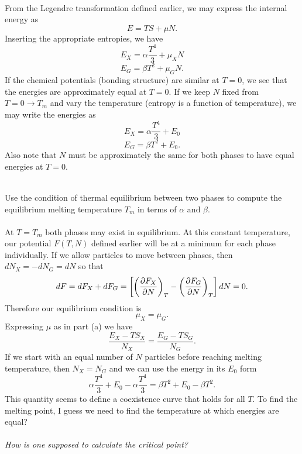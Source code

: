 \documentclass[11pt,letterpaper]{article}
\begin{document}
		\\
		From the Legendre transformation defined earlier, we may express the internal energy as
		\[
			E = TS+\mu N. 
		\]
		Inserting the appropriate entropies, we have
		\[
			E_X = \alpha \frac{T^4}{3}+\mu_X N
		\]
		\[
			E_G = \beta T^2 + \mu_G N.
		\]
		If the chemical potentials (bonding structure) are similar at $T=0$, we see that the energies are approximately equal 
		at $T=0$. If we keep $N$ fixed from $T=0 \to T_m$ and vary the temperature (entropy is a function of temperature), 
		we may write the energies as 
		\[
			E_X = \alpha \frac{T^4}{3}+E_0
		\]
		\[
			E_G = \beta T^2 + E_0.
		\]
		Also note that $N$ must be approximately the same for both phases to have equal energies at $T=0$. 
		\\
		\\
		\item
		Use the condition of thermal equilibrium between two phases to compute the equilibrium melting temperature $T_m$
		in terms of $\alpha$ and $\beta$. 
		\\
		\\
		At $T=T_m$ both phases may exist in equilibrium. At this constant temperature, our potential $F(T,N)$ defined earlier
		will be at a minimum for each phase individually. If we allow particles to move between phases, then 
		$dN_X = -dN_G = dN$ so that
		\[
			dF = dF_X+dF_G  = \blr{\plr{\pdiff[F_X]{N}}_T-\plr{\pdiff[F_G]{N}}_T}dN = 0.
		\]
		Therefore our equilibrium condition is
		\[
			\mu_X = \mu_G.
		\]
		Expressing $\mu$ as in part (a) we have 
		\[
			\frac{E_X-TS_X	}{N_X} = \frac{E_G-TS_G}{N_G}.
		\]	
		If we start with an equal number of $N$ particles before reaching melting temperature, then $N_X=N_G$ and 
		we can use the energy in its $E_0$ form 
		\[
			 \alpha \frac{T^4}{3}+E_0-\alpha \frac{T^4}{3} = \beta T^2 + E_0 -\beta T^2.
		\]
		This quantity seems to define a coexistence curve that holds for all $T$. To find the melting point, I guess
		we need to find the temperature at which energies are equal? 
		\\
		\\
		 \emph{How is one supposed to calculate the critical point?}
		 \\
		
\end{document}
